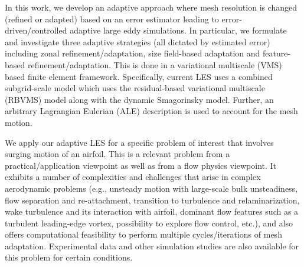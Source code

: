 In this work, we develop an adaptive approach where mesh resolution is changed (refined or adapted) based on an error estimator leading to error-driven/controlled adaptive large eddy simulations.
In particular, we formulate and investigate three adaptive strategies
(all dictated by estimated error) including zonal refinement/adaptation, size field-based adaptation and
feature-based refinement/adaptation. 
This is done in a variational multiscale (VMS) based finite element
framework. 
Specifically, current LES uses a combined subgrid-scale model which uses the residual-based
variational multiscale (RBVMS) model along with the dynamic Smagorinsky model.
Further, an arbitrary Lagrangian Eulerian (ALE) description is used to account for the mesh motion.

We apply our adaptive LES for a specific problem of interest that involves surging motion of an airfoil. 
This is a relevant problem from a practical/application viewpoint as well as from a flow physics viewpoint.
It exhibits a number of complexities and challenges that arise in complex aerodynamic
problems (e.g., unsteady motion with large-scale bulk unsteadiness, flow separation and re-attachment, transition to turbulence and relaminarization, wake turbulence and its interaction with airfoil, dominant flow features such as a turbulent leading-edge vortex, possibility to explore flow control, etc.), and also
offers computational feasibility to perform multiple cycles/iterations of mesh adaptation. Experimental data and other simulation studies are also available for this problem for certain conditions.